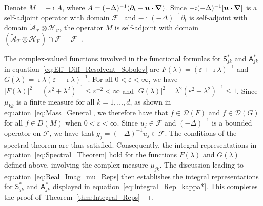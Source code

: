 \documentclass[leqno,onefignum,onetabnum]{siamltex1213}
\newcommand{\thmref}[1]{Theorem~\ref{#1}}
\newcommand{\Tc}{\mathcal{T}}
\newcommand{\Vc}{\mathcal{V}}
\newcommand{\Sm}{\mathsf{S}}
\newcommand{\Am}{\mathsf{A}}
\newcommand{\Hs}{\mathscr{H}}
\newcommand{\As}{\mathscr{A}}
\newcommand{\Ds}{\mathscr{D}}
\newcommand{\Fs}{\mathscr{F}}
\newcommand\bnabla{\mbox{\boldmath${\nabla}$}}
\providecommand\bcdot{\boldsymbol{\cdot}}
\newcommand{\vecu}{\boldsymbol{u}}
\begin{document}
Denote $M=-\imath A$, where $A=(-\Delta)^{-1}(\partial_t-\vecu\bcdot\bnabla)$. Since
$-\imath(-\Delta)^{-1}[\vecu\bcdot\bnabla]$ is a self-adjoint
operator with domain $\Fs$~\cite{Stakgold:BVP:2000} and
$-\imath(-\Delta)^{-1}\partial_t$ is self-adjoint with domain
$\tilde{\As}_{\Tc}\otimes\Hs_{\Vc}$, the operator $M$ is self-adjoint with
domain $(\tilde{\As}_{\Tc}\otimes\Hs_{\Vc})\cap\Fs=\Fs$~\cite{Stone:64}.




The
complex-valued functions involved in the functional formulas for
$\Sm^*_{jk}$ and $\Am^*_{jk}$ in
equation~\eqref{eq:Eff_Diff_Resolvent_Sobolev} are $F(\lambda)=(\varepsilon+\imath\lambda)^{-1}$
and $G(\lambda)=\imath\lambda(\varepsilon+\imath\lambda)^{-1}$. For all $0<\varepsilon<\infty$, 
we have $|F(\lambda)|^2=(\varepsilon^2+\lambda^2)^{-1}\leq\varepsilon^{-2}<\infty$ and 
$|G(\lambda)|^2=\lambda^2(\varepsilon^2+\lambda^2)^{-1}\leq 1$. Since $\mu_{kk}$ is a finite measure
for all $k=1,\ldots,d$, as shown in equation~\eqref{eq:Mass_General}, we
therefore have 
that $f\in\Ds(F)$ and $f\in\Ds(G)$ for all $f\in D(M)$ when $0<\varepsilon<\infty$. Since $u_j\in\Fs$ and $(-\Delta)^{-1}$ is a bounded operator on $\Fs$, we have that 
$g_j=(-\Delta)^{-1}u_j\in\Fs$. The conditions of the spectral theorem are
thus satisfied. Consequently, the integral representations in
equation~\eqref{eq:Spectral_Theorem} hold for the functions $F(\lambda)$ and
$G(\lambda)$ defined above, involving the complex measure $\mu_{jk}$. The
discussion leading to equation~\eqref{eq:Real_Imag_mu_Reps} then
establishes the integral representations for $\Sm^*_{jk}$ and
$\Am^*_{jk}$ displayed in equation~\eqref{eq:Integral_Rep_kappa*}.
This completes the proof of~\thmref{thm:Integral_Reps} $\Box$. 
\end{document}
